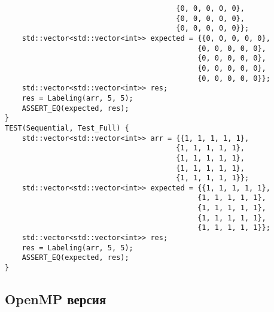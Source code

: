 \documentclass{report}
\begin{document}
\begin{lstlisting}
                                        {0, 0, 0, 0, 0},
                                        {0, 0, 0, 0, 0},
                                        {0, 0, 0, 0, 0}};
    std::vector<std::vector<int>> expected = {{0, 0, 0, 0, 0},
                                             {0, 0, 0, 0, 0},
                                             {0, 0, 0, 0, 0},
                                             {0, 0, 0, 0, 0},
                                             {0, 0, 0, 0, 0}};
    std::vector<std::vector<int>> res;
    res = Labeling(arr, 5, 5);
    ASSERT_EQ(expected, res);
}
TEST(Sequential, Test_Full) {
    std::vector<std::vector<int>> arr = {{1, 1, 1, 1, 1},
                                        {1, 1, 1, 1, 1},
                                        {1, 1, 1, 1, 1},
                                        {1, 1, 1, 1, 1},
                                        {1, 1, 1, 1, 1}};
    std::vector<std::vector<int>> expected = {{1, 1, 1, 1, 1},
                                             {1, 1, 1, 1, 1},
                                             {1, 1, 1, 1, 1},
                                             {1, 1, 1, 1, 1},
                                             {1, 1, 1, 1, 1}};
    std::vector<std::vector<int>> res;
    res = Labeling(arr, 5, 5);
    ASSERT_EQ(expected, res);
}
\end{lstlisting}

\subsection{OpenMP версия}
\end{document}
